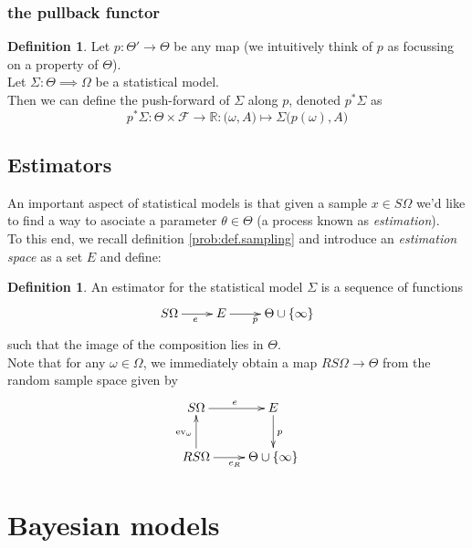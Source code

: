 \documentclass{book}
\theoremstyle{plain}
\theoremstyle{definition}
\newtheorem{definition}[corollary]{Definition}
\renewcommand{\d}[1]{\mathbb{#1}}
\newcommand{\fun}{\mapsto}
\DeclareMathOperator{\ev}{ev}
\newcommand{\mor}{\longrightarrow}
\renewcommand{\r}[1]{\mathcal{#1}}
\renewcommand{\r}[1]{\mathcal{#1}}
\begin{document}
\subsubsection{the pullback functor}

\begin{definition}
Let $p:\Theta'\mor \Theta$ be any map (we intuitively think of $p$ as focussing on a  property of $\Theta$).\\
Let $\Sigma: \Theta\implies \Omega$ be a statistical model.\\
Then we can define the push-forward of $\Sigma$ along $p$, denoted $p^*\Sigma$ as 
\[
p^*\Sigma: \Theta\times \r{F}\mor \d{R}: \big(\omega,A)\fun \Sigma\big(p(\omega), A\big)
\]
\end{definition}



\subsection{Estimators}

\noindent An important aspect of statistical models is that given a sample $x \in S\Omega$ we'd like to find a way to asociate a parameter $\theta \in \Theta$ (a process known as \emph{estimation}).\\
To this end, we  recall definition \ref{prob:def.sampling} and introduce an \emph{estimation space} as a set $E$ and define:

\begin{definition}\label{stats:def.estimators}
An estimator for the statistical model $\Sigma$ is a sequence of functions
\begin{displaymath}
\xymatrix{
S\Omega\ar[r]_{e} & E\ar[r]_p  & \Theta \cup \{\infty\}
}
\end{displaymath}
such that the image of the composition lies in $\Theta$.\\
Note that for any $\omega \in \Omega$, we immediately obtain a map $RS\Omega\mor \Theta$ from the random sample space given by
\begin{displaymath}
\xymatrix{
S\ar[r]^e\Omega & E\ar[d]^p\\
RS\ar[u]^{\ev_{\omega}}\ar[r]_{e_R}\Omega & \Theta\cup\{ \infty \}
}
\end{displaymath}
\end{definition}

\section{Bayesian models}
\end{document}
